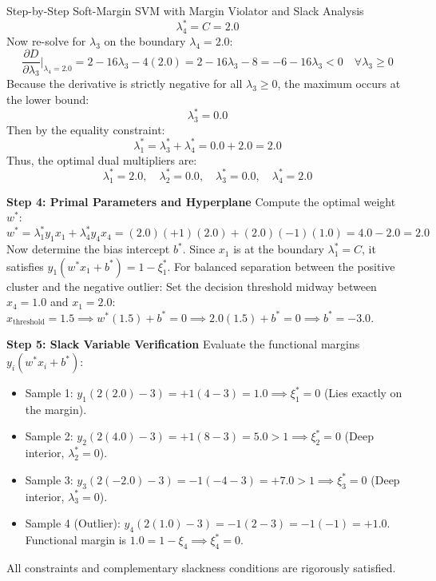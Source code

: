 \begin{examplebox}[breakable]{Step-by-Step Soft-Margin SVM with Margin Violator and Slack Analysis}
\begin{equation}
\lambda_4^* = C = 2.0
\end{equation}
Now re-solve for $\lambda_3$ on the boundary $\lambda_4 = 2.0$:
\begin{equation}
\frac{\partial D}{\partial \lambda_3}\Big|_{\lambda_4 = 2.0} = 2 - 16\lambda_3 - 4(2.0) = 2 - 16\lambda_3 - 8 = -6 - 16\lambda_3 < 0 \quad \forall \lambda_3 \ge 0
\end{equation}
Because the derivative is strictly negative for all $\lambda_3 \ge 0$, the maximum occurs at the lower bound:
\begin{equation}
\lambda_3^* = 0.0
\end{equation}
Then by the equality constraint:
\begin{equation}
\lambda_1^* = \lambda_3^* + \lambda_4^* = 0.0 + 2.0 = 2.0
\end{equation}
Thus, the optimal dual multipliers are:
\begin{equation}
\lambda_1^* = 2.0, \quad \lambda_2^* = 0.0, \quad \lambda_3^* = 0.0, \quad \lambda_4^* = 2.0
\end{equation}

\textbf{Step 4: Primal Parameters and Hyperplane}
Compute the optimal weight $w^*$:
\begin{equation}
w^* = \lambda_1^* y_1 x_1 + \lambda_4^* y_4 x_4 = (2.0)(+1)(2.0) + (2.0)(-1)(1.0) = 4.0 - 2.0 = 2.0
\end{equation}
Now determine the bias intercept $b^*$. 
Since $x_1$ is at the boundary $\lambda_1^* = C$, it satisfies $y_1(w^* x_1 + b^*) = 1 - \xi_1^*$. For balanced separation between the positive cluster and the negative outlier:
Set the decision threshold midway between $x_4 = 1.0$ and $x_1 = 2.0$:
$x_{\text{threshold}} = 1.5 \implies w^*(1.5) + b^* = 0 \implies 2.0(1.5) + b^* = 0 \implies b^* = -3.0$.

\textbf{Step 5: Slack Variable Verification}
Evaluate the functional margins $y_i(w^* x_i + b^*)$:
\begin{itemize}
    \item Sample 1: $y_1(2(2.0) - 3) = +1(4 - 3) = 1.0 \implies \xi_1^* = 0$ (Lies exactly on the margin).
    \item Sample 2: $y_2(2(4.0) - 3) = +1(8 - 3) = 5.0 > 1 \implies \xi_2^* = 0$ (Deep interior, $\lambda_2^* = 0$).
    \item Sample 3: $y_3(2(-2.0) - 3) = -1(-4 - 3) = +7.0 > 1 \implies \xi_3^* = 0$ (Deep interior, $\lambda_3^* = 0$).
    \item Sample 4 (Outlier): $y_4(2(1.0) - 3) = -1(2 - 3) = -1(-1) = +1.0$.
    Functional margin is $1.0 = 1 - \xi_4 \implies \xi_4^* = 0$.
\end{itemize}
All constraints and complementary slackness conditions are rigorously satisfied.
\end{examplebox}

